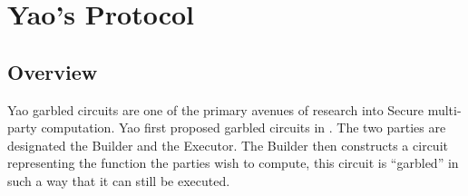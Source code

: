 \documentclass[ %
                    author={Nicholas Tutte},
                supervisor={Prof. Nigel Smart},
                    degree={MEng},
                     title={Secure Two Party Computation},
                  subtitle={A practical comparison of recent protocols},
                      type={Research - GG1K},
                      year={2015} ]{dissertation}
\begin{document}
% 
% 
% 					
% 


	\section{Yao's Protocol} \label{sec:Yao_Circuits}

		\subsection{Overview} \label{sub:Yao_Overview}
			Yao garbled circuits are one of the primary avenues of research into Secure multi-party computation. Yao first proposed garbled circuits in \cite{YaoOriginal}. The two parties are designated the Builder and the Executor. The Builder then constructs a circuit representing the function the parties wish to compute, this circuit is ``garbled'' in such a way that it can still be executed.\\
\end{document}
